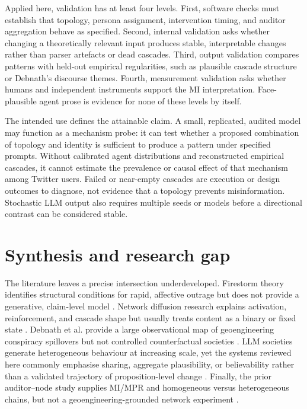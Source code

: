 Applied here, validation has at least four levels.  First, software checks must
establish that topology, persona assignment, intervention timing, and auditor
aggregation behave as specified.  Second, internal validation asks whether
changing a theoretically relevant input produces stable, interpretable changes
rather than parser artefacts or dead cascades.  Third, output validation compares
patterns with held-out empirical regularities, such as plausible cascade
structure or Debnath's discourse themes.  Fourth, measurement validation asks
whether humans and independent instruments support the MI interpretation.
Face-plausible agent prose is evidence for none of these levels by itself.

The intended use defines the attainable claim.  A small, replicated, audited
model may function as a mechanism probe: it can test whether a proposed
combination of topology and identity is sufficient to produce a pattern under
specified prompts.  Without calibrated agent distributions and reconstructed
empirical cascades, it cannot estimate the prevalence or causal effect of that
mechanism among Twitter users.  Failed or near-empty cascades are execution or
design outcomes to diagnose, not evidence that a topology prevents
misinformation.  Stochastic LLM output also requires multiple seeds or models
before a directional contrast can be considered stable.

\section{Synthesis and research gap}
\label{sec:lit-gap}

The literature leaves a precise intersection underdeveloped.  Firestorm theory
identifies structural conditions for rapid, affective outrage but does not
provide a generative, claim-level model \parencite{pfeffer2014firestorms}.
Network diffusion research explains activation, reinforcement, and cascade
shape but usually treats content as a binary or fixed state
\parencite{kempe2003influence,centola2007complex}.  Debnath et al. provide a
large observational map of geoengineering conspiracy spillovers but not
controlled counterfactual societies \parencite{debnath2023conspiracy}.  LLM
societies generate heterogeneous behaviour at increasing scale, yet the
systems reviewed here commonly emphasise sharing, aggregate plausibility,
or believability rather than a validated trajectory of proposition-level change
\parencite{larooij2025validation}.
Finally, the prior auditor--node study supplies MI/MPR and homogeneous versus
heterogeneous chains, but not a geoengineering-grounded network experiment
\parencite{maurya2025simulating}.

